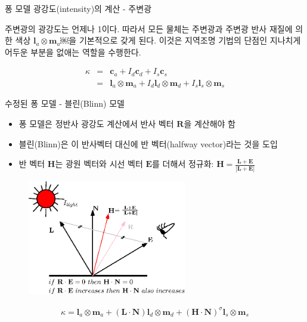 \begin{frame}[fragile]{퐁 모델 광강도(intensity)의 계산 - 주변광}

주변광의 광강도는 언제나 1이다. 따라서 모든 물체는 주변광과 주변광 반사 재질에 의한 색상
$\mathbf l_a \otimes \mathbf m_a$￼을 기본적으로 갖게 된다.  이것은 지역조명 기법의 단점인 지나치게 어두운 부분을 없애는 역할을 수행한다.

\begin{eqnarray} \nonumber
\kappa & = & \mathbf c_a + I_d \mathbf c_d + I_s \mathbf c_s \\ \nonumber 
&  =  & \mathbf l_a \otimes \mathbf m_a + I_d \mathbf l_d \otimes \mathbf m_d + I_s \mathbf l_s \otimes \mathbf m_s \nonumber
\end{eqnarray}

\end{frame}

\begin{frame}[fragile]{수정된 퐁 모델 - 블린(Blinn) 모델}

\begin{itemize}
\item 퐁 모델은 정반사 광강도 계산에서 반사 벡터 $\mathbf R$을 계산해야 함
\item 블린(Blinn)은 이 반사벡터 대신에 반 벡터(halfway vector)라는 것을 도입
\item 반 벡터 $\mathbf H$는 광원 벡터와 시선 벡터 $\mathbf E$를 더해서 정규화: $\mathbf H = \frac{\mathbf L + \mathbf E}{|\mathbf L + \mathbf E|}$
\end{itemize}

\begin{figure}[h!]
  \centering
    \includegraphics[height=5cm]{Math_lighting/halfwayVector.eps}
\end{figure}

\begin{eqnarray}
\kappa  =  \mathbf l_a \otimes \mathbf m_a + (\mathbf L \cdot \mathbf N) \mathbf l_d \otimes \mathbf m_d + 
(\mathbf H \cdot \mathbf N )^\sigma \mathbf l_s \otimes \mathbf m_s \nonumber
\end{eqnarray}


\end{frame}

